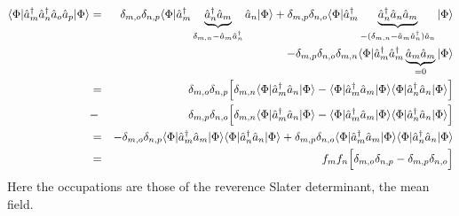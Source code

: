 \documentclass[11pt,a4paper]{report}
\begin{document}
\begin{eqnarray}
\langle \Phi|\hat{a}^\dagger_m\hat{a}^\dagger_n\hat{a}_o\hat{a}_p|\Phi\rangle
&=&\delta_{m,o}\delta_{n,p}
\langle \Phi|\hat{a}^\dagger_m
\underbrace{\hat{a}^\dagger_n\hat{a}_m}_{\delta_{m,n}-\hat{a}_m\hat{a}^\dagger_n}
\hat{a}_n
|\Phi\rangle
+\delta_{m,p}\delta_{n,o}
\langle \Phi|\hat{a}^\dagger_m\underbrace{\hat{a}^\dagger_n\hat{a}_n\hat{a}_m
}_{-(\delta_{m,n}-\hat{a}_m\hat{a}^\dagger_n)\hat{a}_n}
|\Phi\rangle
\nonumber\\
&&-\delta_{m,p}\delta_{n,o}\delta_{m,n}
\langle \Phi|\hat{a}^\dagger_m\hat{a}^\dagger_m\underbrace{\hat{a}_m\hat{a}_m}
_{=0}|\Phi\rangle
\nonumber\\
&=& \delta_{m,o}\delta_{n,p}
\Bigl[
\delta_{m,n}\langle \Phi|\hat{a}^\dagger_m
\hat{a}_n|\Phi\rangle
-
\langle \Phi|\hat{a}^\dagger_m
\hat{a}_m|\Phi\rangle\langle \Phi|\hat{a}^\dagger_n
\hat{a}_n|\Phi\rangle\Bigr]
\nonumber\\
&-& \delta_{m,p}\delta_{n,o}
\Bigl[
\delta_{m,n}\langle \Phi|\hat{a}^\dagger_m
\hat{a}_n|\Phi\rangle
-
\langle \Phi|\hat{a}^\dagger_m
\hat{a}_m|\Phi\rangle\langle \Phi|\hat{a}^\dagger_n
\hat{a}_n|\Phi\rangle\Bigr]
\nonumber\\
&=& -\delta_{m,o}\delta_{n,p}
\langle \Phi|\hat{a}^\dagger_m
\hat{a}_m|\Phi\rangle\langle \Phi|\hat{a}^\dagger_n
\hat{a}_n|\Phi\rangle
+ \delta_{m,p}\delta_{n,o}
\langle \Phi|\hat{a}^\dagger_m
\hat{a}_m|\Phi\rangle\langle \Phi|\hat{a}^\dagger_n
\hat{a}_n|\Phi\rangle
\nonumber\\
&=&f_mf_n\Bigl[\delta_{m,o}\delta_{n,p}-\delta_{m,p}\delta_{n,o}\Bigr]
\end{eqnarray}
Here the occupations are those of the reverence Slater determinant,
the mean field.
\end{document}
